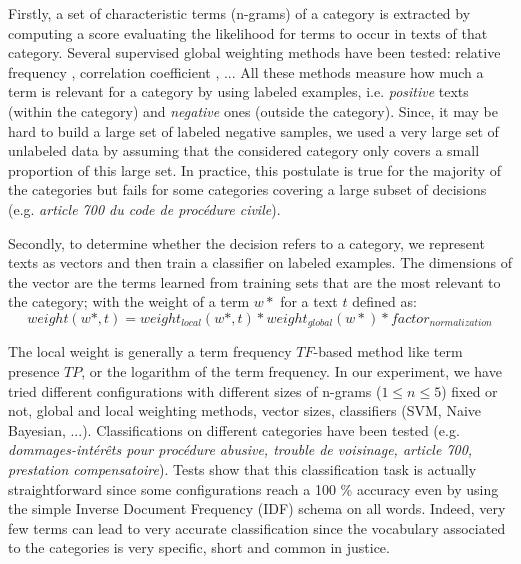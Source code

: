 \documentclass[runningheads,a4paper]{llncs}
\begin{document}
Firstly, a set of characteristic terms (n-grams) of a category is extracted by computing a score evaluating the likelihood for terms to occur in texts of that category.  Several supervised global weighting methods have been tested: relative frequency \cite{lan2009rfweight}, correlation coefficient \cite{ng1997ngl}, %
... All these methods measure how much a term is relevant for a category by using labeled examples, i.e. \textit{positive} texts (within the category) and \textit{negative} ones (outside the category). 
Since, it may be hard to build a large set of labeled negative samples, we used a very large set of unlabeled data by assuming that the considered category only covers a small proportion of this large set. In practice, this postulate is true for the majority of the categories but fails for some categories covering a large subset of decisions (e.g. \textit{article 700 du code de procédure civile}).  


Secondly, to determine whether the decision refers to a category, we represent texts as vectors and then train a classifier on labeled examples. The dimensions of the vector are the terms learned from training sets that are the most relevant to the category; with the weight of a term $w*$ for a text $t$ defined as: \[ weight(w*, t) = weight_{local}(w*, t) * weight_{global}(w*) * factor_{normalization}\]

\noindent The local weight is generally a term frequency $TF$-based method like term presence $TP$, or the logarithm of the term frequency.  
In our experiment, we have tried different configurations with different sizes of n-grams ($1 \leq n \leq 5$) fixed or not, global and local weighting methods, vector sizes, classifiers (SVM, Naive Bayesian, ...). Classifications on different categories have been tested (e.g. \textit{dommages-intérêts pour procédure abusive, trouble de voisinage, article 700, prestation compensatoire}). Tests show that this classification task is actually straightforward since some configurations reach a 100 \% accuracy even by using the simple Inverse Document Frequency (IDF) schema on all words. Indeed, very few terms can lead to very accurate classification since the vocabulary associated to the categories is very specific, short and common in justice.
\end{document}
